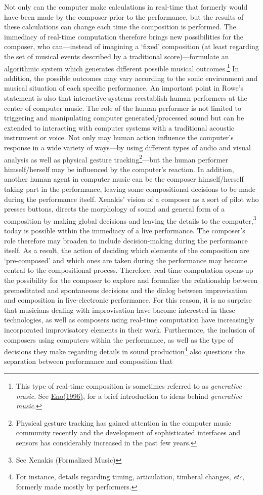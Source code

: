 Not only can the computer make calculations in real-time that formerly would have been made by the composer prior to the performance, but the results of these calculations can change each time the composition is performed. The immediacy of real-time computation therefore brings new possibilities for the composer, who can---instead of imagining a `fixed' composition (at least regarding the set of musical events described by a traditional score)---formulate an algorithmic system which generates different possible musical outcomes.\footnote{This type of real-time composition is sometimes referred to as \emph{generative music}. See \hyperlink{eno}{Eno(1996)}, for a brief introduction to ideas behind \emph{generative music}.} In addition, the possible outcomes may vary according to the sonic environment and musical situation of each specific performance. An important point in Rowe's statement is also that interactive systems reestablish human performers at the center of computer music. The role of the human performer is not limited to triggering and manipulating computer generated/processed sound but can be extended to interacting with computer systems with a traditional acoustic instrument or voice. Not only may human action influence the computer's response in a wide variety of ways---by using different types of audio and visual analysis as well as physical gesture tracking\footnote{Physical gesture tracking has gained attention in the computer music community recently and the development of sophisticated interfaces and sensors has considerably increased in the past few years.}---but the human performer himself/herself may be influenced by the computer's reaction. In addition, another human agent in computer music can be the composer himself/herself taking part in the performance, leaving some compositional decisions to be made during the performance itself. Xenakis' vision of a composer as a sort of pilot who presses buttons, directs the morphology of sound and general form of a composition by making global decisions and leaving the details to the computer,\footnote{See Xenakis (Formalized Music)} today is possible within the immediacy of a live performance. The composer's role therefore may broaden to include decision-making during the performance itself. As a result, the action of deciding which elements of the composition are `pre-composed' and which ones are taken during the performance may become central to the compositional process. Therefore, real-time computation opens-up the possibility for the composer to explore and formalize the relationship between premeditated and spontaneous decisions and the dialog between improvisation and composition in live-electronic performance. For this reason, it is no surprise that musicians dealing with improvisation have bacome interested in these technologies, as well as composers using real-time computation have increasingly incorporated improvisatory elements in their work. Furthermore, the inclusion of composers using computers within the performance, as well as the type of decisions they make regarding details in sound production\footnote{For instance, details regarding timing, articulation, timberal changes, \emph{etc}, formerly made mostly by performers.} also questions the separation between performance and composition that 